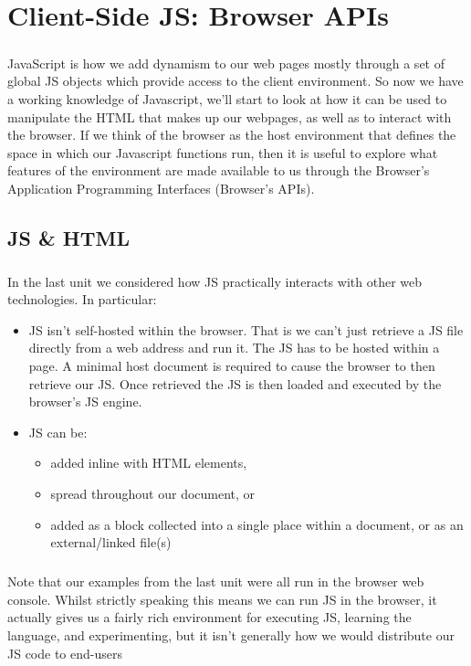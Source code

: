 \chapter{Client-Side JS: Browser APIs}
\label{browser-apis}
\paragraph{} JavaScript is how we add dynamism to our web pages mostly through a set of global JS objects which provide access to the client environment. So now we have a working knowledge of Javascript, we'll start to look at how it can be used to manipulate the HTML that makes up our webpages, as well as to interact with the browser. If we think of the browser as the host environment that defines the space in which our Javascript functions run, then it is useful to explore what features of the environment are made available to us through the Browser's Application Programming Interfaces (Browser’s APIs).


\section{JS \& HTML}
\paragraph{} In the last unit we considered how JS practically interacts with other web technologies. In particular:

\begin{itemize}
\item JS isn’t self-hosted within the browser. That is we can't just retrieve a JS file directly from a web address and run it. The JS has to be hosted within a page. A minimal host document is required to cause the browser to then retrieve our JS. Once retrieved the JS is then loaded and executed by the browser's JS engine.
\item JS can be:
    \begin{itemize}
    \item added inline with HTML elements, 
    \item spread throughout our document, or 
    \item added as a block collected into a single place within a document, or as an external/linked file(s)
    \end{itemize}
\end{itemize}

\paragraph{} Note that our examples from the last unit were all run in the browser web console. Whilst strictly speaking this means we can run JS in the browser, it actually gives us a fairly rich environment for executing JS, learning the language, and experimenting, but it isn't generally how we would distribute our JS code to end-users

